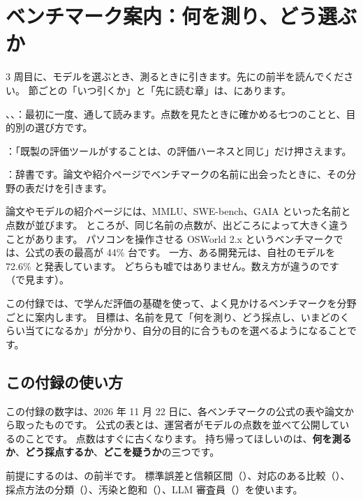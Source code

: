 \chapter{ベンチマーク案内：何を測り、どう選ぶか}\label{app:benchmarks}

\begin{readingguide}
\item[\rgpre] 3 周目に、モデルを選ぶとき、測るときに引きます。先にの前半を読んでください。
  節ごとの「いつ引くか」と「先に読む章」は、にあります。
\item[\rgmust] 、、：最初に一度、通して読みます。点数を見たときに確かめる七つのことと、目的別の選び方です。
\item[\rgskim] ：「既製の評価ツールがすることは、の評価ハーネスと同じ」だけ押さえます。
\item[\rglater] ：辞書です。論文や紹介ページでベンチマークの名前に出会ったときに、その分野の表だけを引きます。
\end{readingguide}

論文やモデルの紹介ページには、MMLU、SWE-bench、GAIA といった名前と点数が並びます。
ところが、同じ名前の点数が、出どころによって大きく違うことがあります。
パソコンを操作させる OSWorld 2.x というベンチマークでは、公式の表の最高が 44\% 台です。
一方、ある開発元は、自社のモデルを 72.6\% と発表しています。
どちらも嘘ではありません。数え方が違うのです（で見ます）。

この付録では、で学んだ評価の基礎を使って、よく見かけるベンチマークを分野ごとに案内します。
目標は、名前を見て「何を測り、どう採点し、いまどのくらい当てになるか」が分かり、自分の目的に合うものを選べるようになることです。

\section{この付録の使い方}\label{sec:bm-howto}

この付録の数字は、2026 年 11 月 22 日に、各ベンチマークの公式の表や論文から取ったものです。
公式の表とは、運営者がモデルの点数を並べて公開しているのことです。
点数はすぐに古くなります。
持ち帰ってほしいのは、\textbf{何を測るか}、\textbf{どう採点するか}、\textbf{どこを疑うか}の三つです。

前提にするのは、の前半です。
標準誤差と信頼区間（）、対応のある比較（）、採点方法の分類（）、汚染と飽和（）、LLM 審査員（）を使います。

